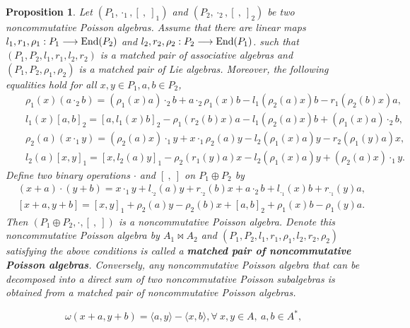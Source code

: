 \documentclass[10pt,a4paper]{amsart}
\newtheorem{pro}{Proposition}
\begin{document}
\begin{pro} \label{Df}
Let $(P_1,\cdot_1,[ \ , \ ]_{1})$ and $(P_2,\cdot_2,[ \ , \ ]_{2})$ be two noncommutative Poisson algebras. Assume that 
 there are linear maps $l_{1},r_{1},\rho_1:P_1\longrightarrow \hbox{End} (P_2)$ and $l_{2},r_{2},\rho_2:P_2\longrightarrow\hbox{End} (P_1)$.
 such that $(P_1,P_2,l_{1},r_{1},l_{2},r_{2})$ is a matched pair of associative algebras and
  $(P_1,P_2,\rho_1,\rho_2)$ is a matched pair of Lie algebras. Moreover,
  the following equalities hold for all $x,y\in P_1,a,b\in P_2$, 
\begin{eqnarray}&&
\label{MP1} \rho_1(x)(a\cdot_2 b)=(\rho_{1}(x)a)\cdot_2 b+a\cdot_2 \rho_{1}(x)b-l_{1}(\rho_2(a)x)b-r_{1}(\rho_2(b)x)a,\\&&
 \label{MP2} l_{1}(x)[a,b]_{2}=[a,l_{1}(x)b]_{2}-\rho_{1}(r_{2}(b) x)a-l_{1}(\rho_2(a)x)b+(\rho_{1}(x)a)\cdot_2 b,\\&&
\label{MP3}  \rho_2(a)(x\cdot_1 y)=(\rho_2(a)x)\cdot_1 y+x\cdot_1 \rho_2(a)y-l_{2}(\rho_{1}(x)a)y-r_{2}(\rho_{1}(y)a)x,\\&&
\label{MP4} l_{2}(a)[x,y]_{1}=[x,l_{2}(a) y]_{1}-\rho_2(r_{1}(y)a)x-l_{2}(\rho_1(x)a)y+(\rho_2(a)x)\cdot_1 y.
\end{eqnarray}
Define two binary operations $\cdot$ and $[ \ , \ ]$ on $P_1\oplus P_2$ by
\begin{align*}&(x+a)\cdot(y+b)=x\cdot_{1}y+l_{\cdot_2}(a)y+r_{\cdot_2}(b)x+a\cdot_{2}b+l_{\cdot_1}(x)b+r_{\cdot_1}(y)a,\\&
[x+a,y+b]=[x,y]_{1}+\rho_2(a)y-\rho_2(b)x+[a,b]_{2}+\rho_1(x)b-\rho_1(y)a.
\end{align*}
Then $(P_1\oplus P_2,\cdot,[ \ , \ ])$ is a noncommutative Poisson algebra.
Denote this noncommutative Poisson algebra by $A_1\bowtie A_2$ and
$(P_{1},P_{2},l_{1},r_{1},\rho_1,l_{2},r_{2},\rho_2)$
satisfying the above conditions is called a {\bf matched pair of
noncommutative Poisson algebras}. Conversely, any noncommutative Poisson algebra that can be decomposed into a
direct sum of two noncommutative Poisson subalgebras is obtained from a matched pair of noncommutative Poisson algebras.
\end{pro}

 \begin{equation}\label{C2}\omega(x+a, y+b) =\langle a,y\rangle-\langle x,b\rangle, \forall~x, y\in A,~a, b\in A^{*},\end{equation}
\end{document}
